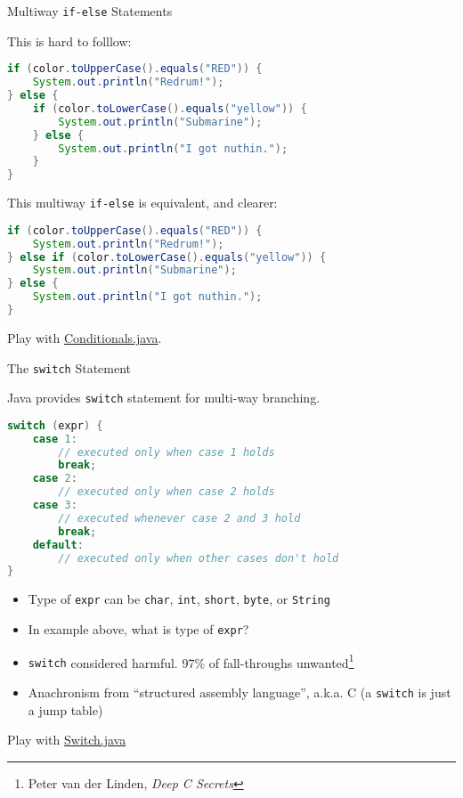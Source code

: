 \documentclass{beamer}
\newcommand{\code}{http://www.cc.gatech.edu/~simpkins/teaching/gatech/cs1331/code}
\begin{document}
\begin{frame}[fragile]{Multiway {\tt if-else} Statements}


This is hard to folllow:
\begin{lstlisting}[language=Java]
if (color.toUpperCase().equals("RED")) {
    System.out.println("Redrum!");
} else {
    if (color.toLowerCase().equals("yellow")) {
        System.out.println("Submarine");
    } else {
        System.out.println("I got nuthin.");
    }
}
\end{lstlisting}
\vspace{-.1in}
This multiway {\tt if-else} is equivalent, and clearer:
\vspace{-.1in}
\begin{lstlisting}[language=Java]
if (color.toUpperCase().equals("RED")) {
    System.out.println("Redrum!");
} else if (color.toLowerCase().equals("yellow")) {
    System.out.println("Submarine");
} else {
    System.out.println("I got nuthin.");
}
\end{lstlisting}

Play with \href{\code/Conditionals.java}{Conditionals.java}.

\end{frame}

\begin{frame}[fragile]{The {\tt switch} Statement}


Java provides {\tt switch} statement for multi-way branching.
\vspace{-.1in}
\begin{lstlisting}[language=Java]
switch (expr) {
    case 1:
        // executed only when case 1 holds
        break;
    case 2:
        // executed only when case 2 holds
    case 3:
        // executed whenever case 2 and 3 hold
        break;
    default:
        // executed only when other cases don't hold        
}
\end{lstlisting}
\vspace{-.15in}
\begin{itemize}
\item Type of {\tt expr} can be {\tt char}, {\tt int}, {\tt short}, {\tt byte}, or {\tt String}
\item In example above, what is type of {\tt expr}?
\item {\tt switch} considered harmful.  97\% of fall-throughs
  unwanted\footnote{Peter van der Linden, {\it Deep C Secrets}}
\item Anachronism from ``structured assembly language'', a.k.a. C (a {\tt switch} is just a jump table)
\end{itemize}

Play with \href{\code/Switch.java}{Switch.java}

\end{frame}
\end{document}
